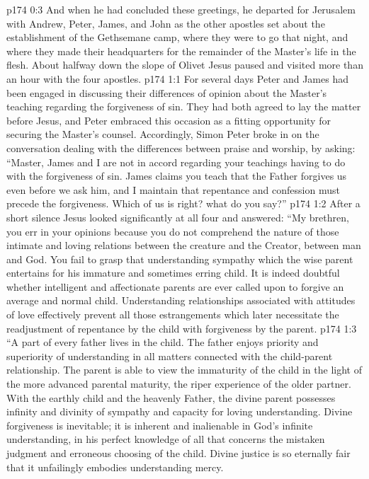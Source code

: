 \vs p174 0:3 And when he had concluded these greetings, he departed for Jerusalem with Andrew, Peter, James, and John as the other apostles set about the establishment of the Gethsemane camp, where they were to go that night, and where they made their headquarters for the remainder of the Master’s life in the flesh. About halfway down the slope of Olivet Jesus paused and visited more than an hour with the four apostles.
\vs p174 1:1 For several days Peter and James had been engaged in discussing their differences of opinion about the Master’s teaching regarding the forgiveness of sin. They had both agreed to lay the matter before Jesus, and Peter embraced this occasion as a fitting opportunity for securing the Master’s counsel. Accordingly, Simon Peter broke in on the conversation dealing with the differences between praise and worship, by asking: “Master, James and I are not in accord regarding your teachings having to do with the forgiveness of sin. James claims you teach that the Father forgives us even before we ask him, and I maintain that repentance and confession must precede the forgiveness. Which of us is right? what do you say?”
\vs p174 1:2 After a short silence Jesus looked significantly at all four and answered: \textcolor{ubdarkred}{“My brethren, you err in your opinions because you do not comprehend the nature of those intimate and loving relations between the creature and the Creator, between man and God. You fail to grasp that understanding sympathy which the wise parent entertains for his immature and sometimes erring child. It is indeed doubtful whether intelligent and affectionate parents are ever called upon to forgive an average and normal child. Understanding relationships associated with attitudes of love effectively prevent all those estrangements which later necessitate the readjustment of repentance by the child with forgiveness by the parent.}
\vs p174 1:3 \textcolor{ubdarkred}{“A part of every father lives in the child. The father enjoys priority and superiority of understanding in all matters connected with the child\hyp{}parent relationship. The parent is able to view the immaturity of the child in the light of the more advanced parental maturity, the riper experience of the older partner. With the earthly child and the heavenly Father, the divine parent possesses infinity and divinity of sympathy and capacity for loving understanding. Divine forgiveness is inevitable; it is inherent and inalienable in God’s infinite understanding, in his perfect knowledge of all that concerns the mistaken judgment and erroneous choosing of the child. Divine justice is so eternally fair that it unfailingly embodies understanding mercy.}

